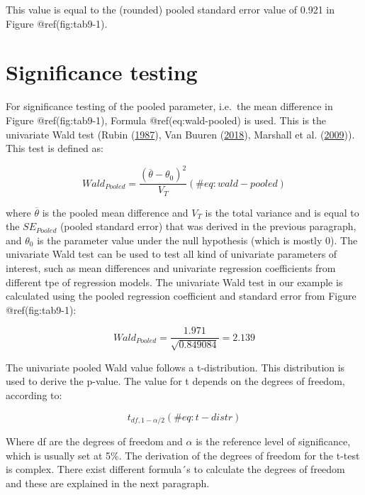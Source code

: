 \documentclass[
]{book}
\begin{document}
This value is equal to the (rounded) pooled standard error value of
0.921 in Figure @ref(fig:tab9-1).

\hypertarget{significance-testing}{%
\section{Significance testing}\label{significance-testing}}

For significance testing of the pooled parameter, i.e.~the mean
difference in Figure @ref(fig:tab9-1), Formula @ref(eq:wald-pooled) is
used. This is the univariate Wald test (Rubin
(\protect\hyperlink{ref-Rubin1987}{1987}), Van Buuren
(\protect\hyperlink{ref-VanBuuren2018}{2018}), Marshall et al.
(\protect\hyperlink{ref-Marshall2009MedResMeth}{2009})). This test is
defined as:

\begin{equation}
Wald_{Pooled} =\frac{(\overline{\theta} - {\theta_0})^2}{V_T}
  (\#eq:wald-pooled)
\end{equation}

where \(\overline{\theta}\) is the pooled mean difference and \(V_T\) is
the total variance and is equal to the \(SE_{Pooled}\) (pooled standard
error) that was derived in the previous paragraph, and \(\theta_0\) is
the parameter value under the null hypothesis (which is mostly 0). The
univariate Wald test can be used to test all kind of univariate
parameters of interest, such as mean differences and univariate
regression coefficients from different tpe of regression models. The
univariate Wald test in our example is calculated using the pooled
regression coefficient and standard error from Figure @ref(fig:tab9-1):

\[Wald_{Pooled} = \frac{1.971}{\sqrt{0.849084}}=2.139\]

The univariate pooled Wald value follows a t-distribution. This
distribution is used to derive the p-value. The value for t depends on
the degrees of freedom, according to:

\begin{equation}
t_{df,1-\alpha/2}
  (\#eq:t-distr)
\end{equation}

Where df are the degrees of freedom and \(\alpha\) is the reference
level of significance, which is usually set at 5\%. The derivation of
the degrees of freedom for the t-test is complex. There exist different
formula´s to calculate the degrees of freedom and these are explained in
the next paragraph.
\end{document}
